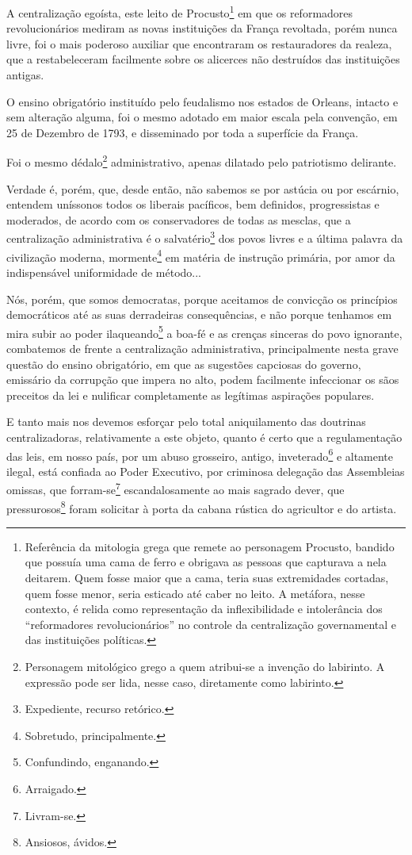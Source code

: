 A centralização egoísta, este leito de Procusto\footnote{Referência da
  mitologia grega que remete ao personagem Procusto, bandido que possuía
  uma cama de ferro e obrigava as pessoas que capturava a nela deitarem.
  Quem fosse maior que a cama, teria suas extremidades cortadas, quem
  fosse menor, seria esticado até caber no leito. A metáfora, nesse
  contexto, é relida como representação da inflexibilidade e
  intolerância dos ``reformadores revolucionários'' no controle da
  centralização governamental e das instituições políticas.} em que os
reformadores revolucionários mediram as novas instituições da França
revoltada, porém nunca livre, foi o mais poderoso auxiliar que
encontraram os restauradores da realeza, que a restabeleceram facilmente
sobre os alicerces não destruídos das instituições antigas.

O ensino obrigatório instituído pelo feudalismo nos estados de Orleans,
intacto e sem alteração alguma, foi o mesmo adotado em maior escala pela
convenção, em 25 de Dezembro de 1793, e disseminado por toda a
superfície da França.

Foi o mesmo dédalo\footnote{Personagem mitológico grego a quem
  atribui-se a invenção do labirinto. A expressão pode ser lida, nesse
  caso, diretamente como labirinto.} administrativo, apenas dilatado
pelo patriotismo delirante.

Verdade é, porém, que, desde então, não sabemos se por astúcia ou por
escárnio, entendem uníssonos todos os liberais pacíficos, bem definidos,
progressistas e moderados, de acordo com os conservadores de todas as
mesclas, que a centralização administrativa é o salvatério\footnote{
  Expediente, recurso retórico.} dos povos livres e a última palavra da
civilização moderna, mormente\footnote{Sobretudo, principalmente.} em
matéria de instrução primária, por amor da indispensável uniformidade de
método...

Nós, porém, que somos democratas, porque aceitamos de convicção os
princípios democráticos até as suas derradeiras consequências, e não
porque tenhamos em mira subir ao poder ilaqueando\footnote{
  Confundindo, enganando.} a boa-fé e as crenças sinceras do povo
ignorante, combatemos de frente a centralização administrativa,
principalmente nesta grave questão do ensino obrigatório, em que as
sugestões capciosas do governo, emissário da corrupção que impera no
alto, podem facilmente infeccionar os sãos preceitos da lei e nulificar
completamente as legítimas aspirações populares.

E tanto mais nos devemos esforçar pelo total aniquilamento das doutrinas
centralizadoras, relativamente a este objeto, quanto é certo que a
regulamentação das leis, em nosso país, por um abuso grosseiro, antigo,
inveterado\footnote{Arraigado.} e altamente ilegal, está confiada ao
Poder Executivo, por criminosa delegação das Assembleias omissas, que
forram-se\footnote{Livram-se.} escandalosamente ao mais sagrado dever,
que pressurosos\footnote{Ansiosos, ávidos.} foram solicitar à porta da
cabana rústica do agricultor e do artista.

